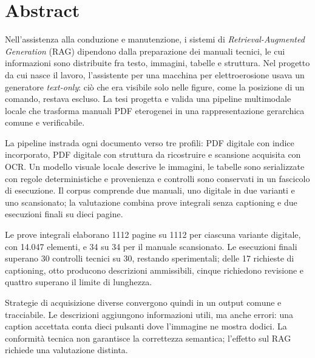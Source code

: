 \chapter*{Abstract}

Nell'assistenza alla conduzione e manutenzione, i sistemi di \emph{Retrieval-Augmented Generation} (RAG) dipendono dalla preparazione dei manuali tecnici, le cui informazioni sono distribuite fra testo, immagini, tabelle e struttura. Nel progetto da cui nasce il lavoro, l'assistente per una macchina per elettroerosione usava un generatore \emph{text-only}: ciò che era visibile solo nelle figure, come la posizione di un comando, restava escluso. La tesi progetta e valida una pipeline multimodale locale che trasforma manuali PDF eterogenei in una rappresentazione gerarchica comune e verificabile.

La pipeline instrada ogni documento verso tre profili: PDF digitale con indice incorporato, PDF digitale con struttura da ricostruire e scansione acquisita con OCR. Un modello visuale locale descrive le immagini, le tabelle sono serializzate con regole deterministiche e provenienza e controlli sono conservati in un fascicolo di esecuzione. Il corpus comprende due manuali, uno digitale in due varianti e uno scansionato; la valutazione combina prove integrali senza captioning e due esecuzioni finali su dieci pagine.

Le prove integrali elaborano 1112 pagine su 1112 per ciascuna variante digitale, con 14.047 elementi, e 34 su 34 per il manuale scansionato. Le esecuzioni finali superano 30 controlli tecnici su 30, restando sperimentali; delle 17 richieste di captioning, otto producono descrizioni ammissibili, cinque richiedono revisione e quattro superano il limite di lunghezza.

Strategie di acquisizione diverse convergono quindi in un output comune e tracciabile. Le descrizioni aggiungono informazioni utili, ma anche errori: una caption accettata conta dieci pulsanti dove l'immagine ne mostra dodici. La conformità tecnica non garantisce la correttezza semantica; l'effetto sul RAG richiede una valutazione distinta.